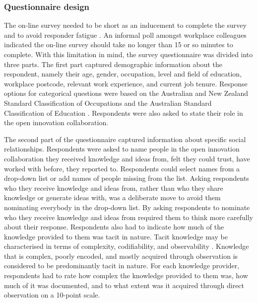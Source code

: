 \subsubsection{Questionnaire design}

The on-line survey needed to be short as an inducement to complete the survey and to avoid responder fatigue \citep{crawford2001web,van2006conducting}. An informal poll amongst workplace colleagues indicated the on-line survey should take no longer than 15 or so minutes to complete. With this limitation in mind, the survey questionnaire was divided into three parts. The first part captured demographic information about the respondent, namely their age, gender, occupation, level and field of education, workplace postcode, relevant work experience, and current job tenure. Response options for categorical questions were based on the Australian and New Zealand Standard Classification of Occupations \citep{pink2009anzsco} and the Australian Standard Classification of Education \citep{trewin2000australian}. Respondents were also asked to state their role in the open innovation collaboration.\medskip

The second part of the questionnaire captured information about specific social relationships. Respondents were asked to name people in the open innovation collaboration they received knowledge and ideas from, felt they could trust, have worked with before, they reported to. Respondents could select names from a drop-down list or add names of people missing from the list. Asking respondents who they receive knowledge and ideas from, rather than who they share knowledge or generate ideas with, was a deliberate move to avoid them nominating everybody in the drop-down list. By asking respondents to nominate who they receive knowledge and ideas from required them to think more carefully about their response. Respondents also had to indicate how much of the knowledge provided to them was tacit in nature. Tacit knowledge may be characterised in terms of complexity, codifiability, and observability \citep{zander1995knowledge,cavusgil2003tacit,perez2011does}. Knowledge that is complex, poorly encoded, and mostly acquired through observation is considered to be predominantly tacit in nature. For each knowledge provider, respondents had to rate how complex the knowledge provided to them was, how much of it was documented, and to what extent was it acquired through direct observation on a 10-point scale.\medskip 

